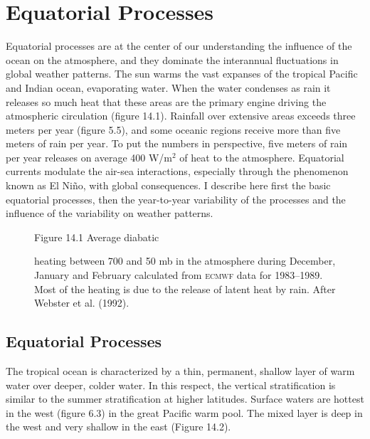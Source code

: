 \chapter{Equatorial Processes}
Equatorial processes are at the center of our understanding the
influence of the ocean on the atmosphere, and they dominate the
interannual fluctuations in global weather patterns. The
sun warms the vast expanses of the
tropical Pacific and Indian ocean, evaporating water. When the water
condenses as rain it releases so much heat that these areas are the
primary engine driving the atmospheric circulation (figure 14.1).
Rainfall over extensive areas
exceeds three meters per year (figure 5.5), and some oceanic regions
receive more than five meters of rain per year. To put the numbers in
perspective, five meters of rain per year releases on average 400
W/m$^2$ of heat to the atmosphere. Equatorial currents modulate the
air-sea interactions, especially through the phenomenon known as El
Ni\~{n}o, with global consequences. I describe here first the basic
equatorial processes, then the year-to-year variability of the
processes and the influence of the variability on weather patterns.

\begin{figure}[b!]
\vspace{-3ex}
\footnotesize
Figure 14.1 Average diabatic \rule{0pt}{3ex}heating between 700 and 50
mb in the atmosphere during December, January and February calculated
from \textsc{ecmwf} data for 1983--1989. Most of the heating is due to
the release of latent heat by rain.  After Webster et al. (1992).
\label{fig:rainheat}
\end{figure}

\section{Equatorial Processes}
The tropical ocean is characterized by a
thin, permanent, shallow layer of warm water over deeper, colder
water. In this respect, the vertical stratification is similar to the
summer stratification at higher latitudes. Surface waters are hottest
in the west (figure 6.3) in the great Pacific warm pool. The mixed
layer is deep in the west and very
shallow in the east (Figure 14.2).

